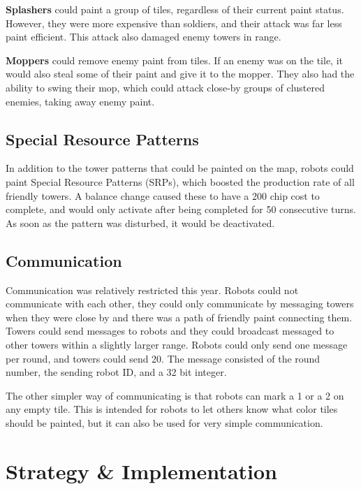 \documentclass{article}
\begin{document}
  \medskip

  \textbf{Splashers} could paint a group of tiles, regardless of their current paint status. However, they were more expensive than soldiers, and their attack was far less paint efficient. This attack also damaged enemy towers in range.

  \medskip

  \textbf{Moppers} could remove enemy paint from tiles. If an enemy was on the tile, it would also steal some of their paint and give it to the mopper. They also had the ability to swing their mop, which could attack close-by groups of clustered enemies, taking away enemy paint.

  \subsection{Special Resource Patterns}

  In addition to the tower patterns that could be painted on the map, robots could paint Special Resource Patterns (SRPs), which boosted the production rate of all friendly towers. A balance change caused these to have a 200 chip cost to complete, and would only activate after being completed for 50 consecutive turns. As soon as the pattern was disturbed, it would be deactivated.

  \subsection{Communication}

  Communication was relatively restricted this year. Robots could not communicate with each other, they could only communicate by messaging towers when they were close by and there was a path of friendly paint connecting them. Towers could send messages to robots and they could broadcast messaged to other towers within a slightly larger range. Robots could only send one message per round, and towers could send 20. The message consisted of the round number, the sending robot ID, and a 32 bit integer.

  \medskip

  The other simpler way of communicating is that robots can mark a 1 or a 2 on any empty tile. This is intended for robots to let others know what color tiles should be painted, but it can also be used for very simple communication.

  \section{Strategy \& Implementation}
\end{document}
